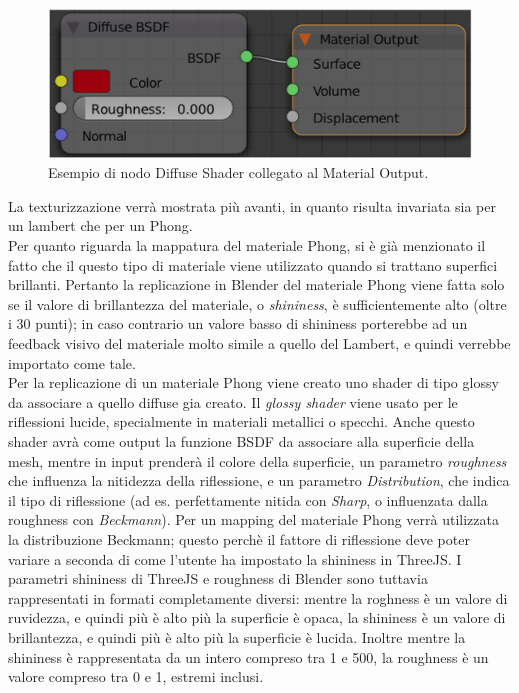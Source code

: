 \\
\begin{figure}[htb]
 \centering
 \includegraphics[width=1\linewidth]{images/chapter_baking_service/ba_se_diffuse.png}\hfill
 \caption[Diffuse shader Blender]{Esempio di nodo Diffuse Shader collegato al Material Output.}
 \label{fig:ba_se_diffuse}
\end{figure}
La texturizzazione verrà mostrata più avanti, in quanto risulta invariata sia per un lambert che per un Phong.
\\ 
Per quanto riguarda la mappatura del materiale Phong, si è già menzionato il fatto che il questo tipo di materiale viene utilizzato quando si trattano superfici brillanti. Pertanto la replicazione in Blender del materiale Phong viene fatta solo se il valore di brillantezza del materiale, o \emph{shininess}, è sufficientemente alto (oltre i 30 punti); in caso contrario un valore basso di shininess porterebbe ad un feedback visivo del materiale molto simile a quello del Lambert, e quindi verrebbe importato come tale. 
\\
Per la replicazione di un materiale Phong viene creato uno shader di tipo glossy da associare a quello diffuse gia creato. Il \emph{glossy shader} viene usato per le riflessioni lucide, specialmente in materiali metallici o specchi. Anche questo shader avrà come output la funzione BSDF da associare alla superficie della mesh, mentre in input prenderà il colore della superficie, un parametro \emph{roughness} che influenza la nitidezza della riflessione, e un parametro \emph{Distribution}, che indica il tipo di riflessione (ad es. perfettamente nitida con \emph{Sharp}, o influenzata dalla roughness con \emph{Beckmann}). Per un mapping del materiale Phong verrà utilizzata la distribuzione Beckmann; questo perchè il fattore di riflessione deve poter variare a seconda di come l’utente ha impostato la shininess in ThreeJS. I parametri shininess di ThreeJS e roughness di Blender sono tuttavia rappresentati in formati completamente diversi: mentre la roghness è un valore di ruvidezza, e quindi più è alto più la superficie è opaca, la shininess è un valore di brillantezza, e quindi più è alto più la superficie è lucida. Inoltre mentre la shininess è rappresentata da un intero compreso tra 1 e 500, la roughness è un valore compreso tra 0 e 1, estremi inclusi.
